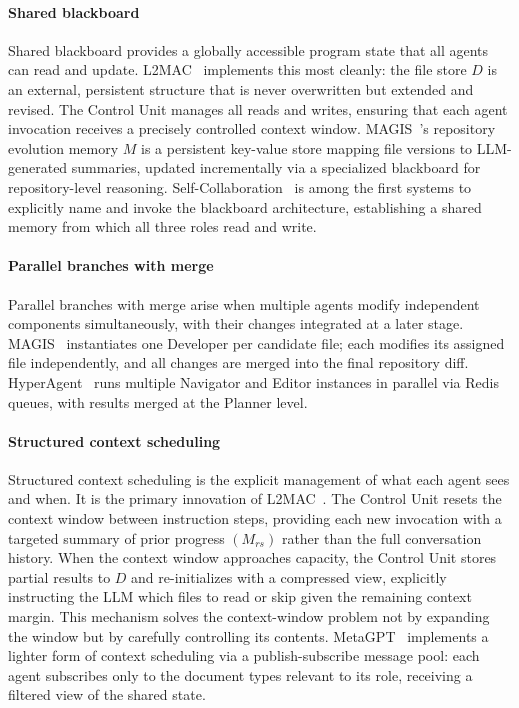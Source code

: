 \documentclass{llmxive}
\begin{document}
\paragraph{Shared blackboard} Shared blackboard provides a
globally accessible program state that all agents can read and
update. L2MAC~\cite{Holt2023L2MAC} implements this most cleanly:
the file store $D$ is an external, persistent structure that is
never overwritten but extended and revised. The Control Unit
manages all reads and writes, ensuring that each agent invocation
receives a precisely controlled context window.
MAGIS~\cite{Tao2024Magis}'s repository evolution memory $M$ is a
persistent key-value store mapping file versions to
LLM-generated summaries, updated incrementally via a specialized
blackboard for repository-level reasoning.
Self-Collaboration~\cite{Dong2024SelfCollaboration} is among the
first systems to explicitly name and invoke the blackboard
architecture, establishing a shared memory from which all three
roles read and write.

\paragraph{Parallel branches with merge} Parallel branches with
merge arise when multiple agents modify independent components
simultaneously, with their changes integrated at a later stage.
MAGIS~\cite{Tao2024Magis} instantiates one Developer per
candidate file; each modifies its assigned file independently,
and all changes are merged into the final repository diff.
HyperAgent~\cite{Phan2024HyperAgent} runs multiple Navigator and
Editor instances in parallel via Redis queues, with results
merged at the Planner level.

\paragraph{Structured context scheduling} Structured context
scheduling is the explicit management of what each agent sees and
when. It is the primary innovation of
L2MAC~\cite{Holt2023L2MAC}. The Control Unit resets the context
window between instruction steps, providing each new invocation
with a targeted summary of prior progress $(M_{rs})$ rather than
the full conversation history. When the context window approaches
capacity, the Control Unit stores partial results to $D$ and
re-initializes with a compressed view, explicitly instructing the
LLM which files to read or skip given the remaining context
margin. This mechanism solves the context-window problem not by
expanding the window but by carefully controlling its contents.
MetaGPT~\cite{Hong2023MetaGPT} implements a lighter form of
context scheduling via a publish-subscribe message pool: each
agent subscribes only to the document types relevant to its role,
receiving a filtered view of the shared state.
\end{document}
